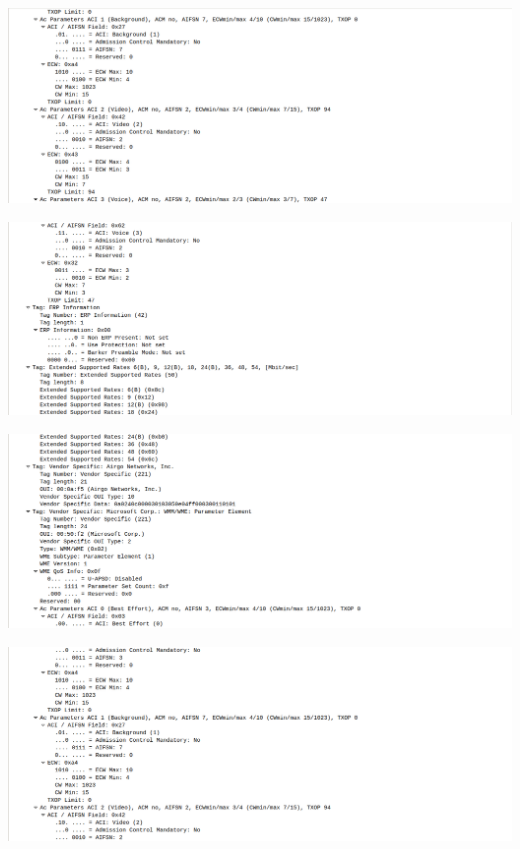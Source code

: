 \documentclass{article}
\begin{document}
\begin{center}
\includegraphics[scale=0.3]{WLAN/correcto8.png}
\end{center}
\begin{center}
\includegraphics[scale=0.3]{WLAN/correcto9.png}
\end{center}
\begin{center}
\includegraphics[scale=0.3]{WLAN/correcto10.png}
\end{center}
\begin{center}
\includegraphics[scale=0.3]{WLAN/correcto11.png}
\end{center}
\end{document}

